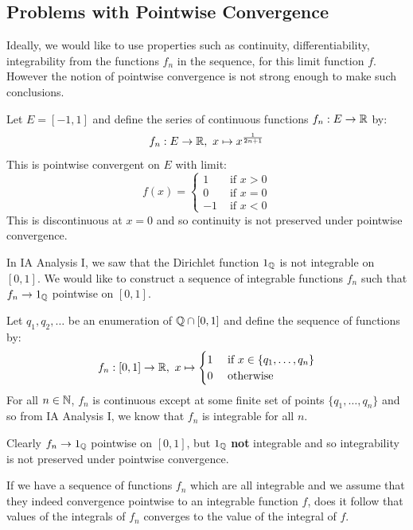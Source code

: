 \documentclass[../main.tex]{subfiles}
\begin{document}
\subsection{Problems with Pointwise Convergence}
Ideally, we would like to use properties such as continuity, differentiability, integrability from the functions $f_n$ in the sequence, for this limit function $f$.
However the notion of pointwise convergence is not strong enough to make such conclusions.
\begin{example}
  Let $E = [-1, 1]$ and define the series of continuous functions $f_n: E \to \mathbb{R}$ by:
  \[
    f_n: E \to \mathbb{R},\ x \mapsto x^{\frac{1}{2n + 1}}
  \]
  This is pointwise convergent on $E$ with limit:
  \[
    f(x) = \begin{cases}
    1 & \text{ if } x > 0 \\
    0 & \text{ if } x = 0 \\
    -1 & \text{ if } x < 0
    \end{cases}
  \]
  This is discontinuous at $x = 0$ and so continuity is not preserved under pointwise convergence.
\end{example}
\begin{example}
  In IA Analysis I, we saw that the Dirichlet function $1_{\mathbb{Q}}$ is not integrable on $[0, 1]$.
  We would like to construct a sequence of integrable functions $f_n$ such that $f_n \to 1_{\mathbb{Q}}$ pointwise on $[0, 1]$.

  Let $q_1, q_2, \ldots$ be an enumeration of $\mathbb{Q} \cap [0, 1]$ and define the sequence of functions by:
  \[
    f_n: [0, 1] \to \mathbb{R},\ x \mapsto \begin{cases}
    1 & \text{ if } x \in \{q_1, \ldots, q_n\} \\
    0 & \text{ otherwise }
    \end{cases}
  \]
  For all $n \in \mathbb{N}$, $f_n$ is continuous except at some finite set of points $\{q_1, \ldots, q_n\}$ and so from IA Analysis I, we know that $f_n$ is integrable for all $n$.

  Clearly $f_n \to 1_{\mathbb{Q}}$ pointwise on $[0, 1]$, but $1_{\mathbb{Q}}$ \textbf{not} integrable and so integrability is not preserved under pointwise convergence.
\end{example}
If we have a sequence of functions $f_n$ which are all integrable and we assume that they indeed convergence pointwise to an integrable function $f$, does it follow that values of the integrals of $f_n$ converges to the value of the integral of $f$.
\end{document}
